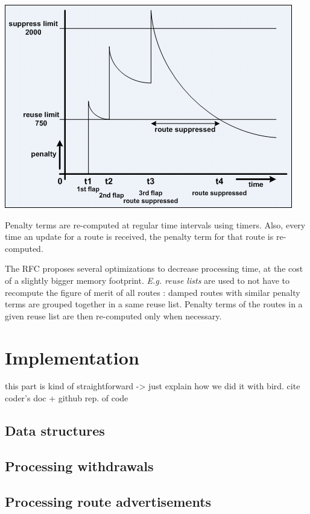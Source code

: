 \documentclass[a4paper,english]{IEEEtran}
\begin{document}
\begin{center}
\includegraphics[scale=.5]{route_damping.png}
\end{center}

Penalty terms are re-computed at regular time intervals using timers. Also, every time an update for a route is received, the penalty term for that route is re-computed.

The RFC proposes several optimizations to decrease processing time, at the cost of a slightly bigger memory footprint.
\textit{E.g. reuse lists} are used to not have to recompute the figure of merit of all routes : damped routes with similar penalty terms are grouped together in a same reuse list.
Penalty terms of the routes in a given reuse list are then re-computed only when necessary.

\section{Implementation}

this part is kind of straightforward -> just explain how we did it
with bird. cite coder's doc + github rep. of code


\subsection{Data structures}


\subsection{Processing withdrawals}


\subsection{Processing route advertisements}
\end{document}

